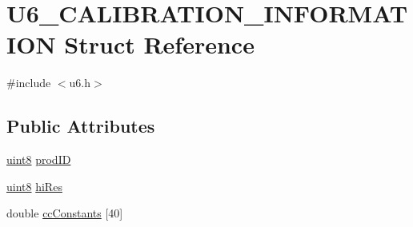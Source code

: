 \hypertarget{structU6__CALIBRATION__INFORMATION}{\section{U6\-\_\-\-C\-A\-L\-I\-B\-R\-A\-T\-I\-O\-N\-\_\-\-I\-N\-F\-O\-R\-M\-A\-T\-I\-O\-N Struct Reference}
\label{structU6__CALIBRATION__INFORMATION}
}


{\ttfamily \#include $<$u6.\-h$>$}

\subsection*{Public Attributes}
\begin{DoxyCompactItemize}
\item 
\hyperlink{u6_8h_adde6aaee8457bee49c2a92621fe22b79}{uint8} \hyperlink{structU6__CALIBRATION__INFORMATION_a8ca95218c797bfb20202d9cb32ca5a70}{prod\-I\-D}
\item 
\hyperlink{u6_8h_adde6aaee8457bee49c2a92621fe22b79}{uint8} \hyperlink{structU6__CALIBRATION__INFORMATION_a2a621c3dc6e444fc947e536d7910c81c}{hi\-Res}
\item 
double \hyperlink{structU6__CALIBRATION__INFORMATION_a8f1f630eec649ae0fc9a946787a3cfdf}{cc\-Constants} \mbox{[}40\mbox{]}
\end{DoxyCompactItemize}


